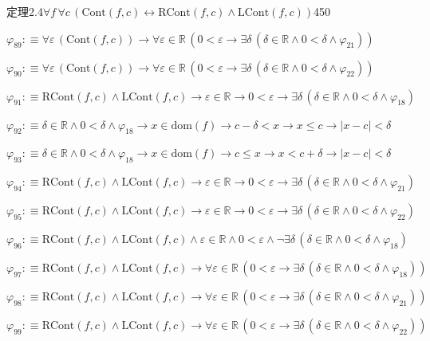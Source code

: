\begin{fullproof}{定理2.4}{$\forall f\,\forall c\,(\mathrm{Cont}(f,c) \leftrightarrow \mathrm{RCont}(f,c) \land \mathrm{LCont}(f,c))$}{450}
\begin{abbrevlist}
\item $\varphi_{89} :\equiv \forall \varepsilon\,(\mathrm{Cont}(f,c)) \to \forall \varepsilon \in \mathbb{R}\,(0 < \varepsilon \to \exists \delta\,(\delta \in \mathbb{R} \land 0 < \delta \land \varphi_{21}))$
\item $\varphi_{90} :\equiv \forall \varepsilon\,(\mathrm{Cont}(f,c)) \to \forall \varepsilon \in \mathbb{R}\,(0 < \varepsilon \to \exists \delta\,(\delta \in \mathbb{R} \land 0 < \delta \land \varphi_{22}))$
\item $\varphi_{91} :\equiv \mathrm{RCont}(f,c) \land \mathrm{LCont}(f,c) \to \varepsilon \in \mathbb{R} \to 0 < \varepsilon \to \exists \delta\,(\delta \in \mathbb{R} \land 0 < \delta \land \varphi_{18})$
\item $\varphi_{92} :\equiv \delta \in \mathbb{R} \land 0 < \delta \land \varphi_{18} \to x \in \mathrm{dom}(f) \to c - \delta < x \to x \leq c \to \lvert x - c \rvert < \delta$
\item $\varphi_{93} :\equiv \delta \in \mathbb{R} \land 0 < \delta \land \varphi_{18} \to x \in \mathrm{dom}(f) \to c \leq x \to x < c + \delta \to \lvert x - c \rvert < \delta$
\item $\varphi_{94} :\equiv \mathrm{RCont}(f,c) \land \mathrm{LCont}(f,c) \to \varepsilon \in \mathbb{R} \to 0 < \varepsilon \to \exists \delta\,(\delta \in \mathbb{R} \land 0 < \delta \land \varphi_{21})$
\item $\varphi_{95} :\equiv \mathrm{RCont}(f,c) \land \mathrm{LCont}(f,c) \to \varepsilon \in \mathbb{R} \to 0 < \varepsilon \to \exists \delta\,(\delta \in \mathbb{R} \land 0 < \delta \land \varphi_{22})$
\item $\varphi_{96} :\equiv \mathrm{RCont}(f,c) \land \mathrm{LCont}(f,c) \land \varepsilon \in \mathbb{R} \land 0 < \varepsilon \land \neg \exists \delta\,(\delta \in \mathbb{R} \land 0 < \delta \land \varphi_{18})$
\item $\varphi_{97} :\equiv \mathrm{RCont}(f,c) \land \mathrm{LCont}(f,c) \to \forall \varepsilon \in \mathbb{R}\,(0 < \varepsilon \to \exists \delta\,(\delta \in \mathbb{R} \land 0 < \delta \land \varphi_{18}))$
\item $\varphi_{98} :\equiv \mathrm{RCont}(f,c) \land \mathrm{LCont}(f,c) \to \forall \varepsilon \in \mathbb{R}\,(0 < \varepsilon \to \exists \delta\,(\delta \in \mathbb{R} \land 0 < \delta \land \varphi_{21}))$
\item $\varphi_{99} :\equiv \mathrm{RCont}(f,c) \land \mathrm{LCont}(f,c) \to \forall \varepsilon \in \mathbb{R}\,(0 < \varepsilon \to \exists \delta\,(\delta \in \mathbb{R} \land 0 < \delta \land \varphi_{22}))$

\end{abbrevlist}
\end{fullproof}
